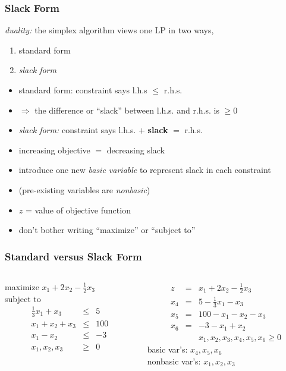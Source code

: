 \documentclass[10pt,aspectratio=169]{beamer}
\begin{document}
\begin{frame} \frametitle{Slack Form}
\emph{duality:} the simplex algorithm views one LP in two ways,
\begin{enumerate}
  \item standard form
  \item \emph{slack form}
\end{enumerate}
\begin{itemize}
  \item standard form: constraint says l.h.s $\leq$ r.h.s.
  \item $\Rightarrow$ the difference or ``slack'' between l.h.s. and r.h.s.
    is $\geq 0$
  \item \emph{slack form:} constraint says l.h.s. $+$ \textbf{slack} $=$ r.h.s.
  \item increasing objective $=$ decreasing slack
  \item introduce one new \emph{basic variable} to represent slack in each constraint
  \item (pre-existing variables are \emph{nonbasic})
  \item $z$ = value of objective function
  \item don't bother writing ``maximize'' or ``subject to''
\end{itemize}
\end{frame}

\begin{frame} \frametitle{Standard versus Slack Form}
\begin{columns}
\begin{column}{.5\textwidth}
  maximize $x_1 + 2x_2 - \frac{1}{2} x_3$ \\
  subject to
  \begin{eqnarray*}
    \frac{1}{3} x_1 + x_3 &\leq& 5 \\
    x_1 + x_2 + x_3 &\leq& 100 \\
    x_1 - x_2 &\leq& -3 \\
    x_1, x_2, x_3 &\geq& 0
  \end{eqnarray*}
\end{column}
\begin{column}{.5\textwidth}
  \begin{eqnarray*}
    z &=& x_1 + 2x_2 - \frac{1}{2} x_3 \\
    x_4 &=& 5 - \frac{1}{3} x_1 - x_3 \\
    x_5 &=& 100 - x_1 - x_2 - x_3 \\
    x_6 &=& -3 -x_1 + x_2 \\
    & & x_1, x_2, x_3, x_4, x_5, x_6 \geq 0
  \end{eqnarray*}
  basic var's: $x_4, x_5, x_6$ \\
  nonbasic var's: $x_1, x_2, x_3$
\end{column}
\end{columns}
\end{frame}
\end{document}
